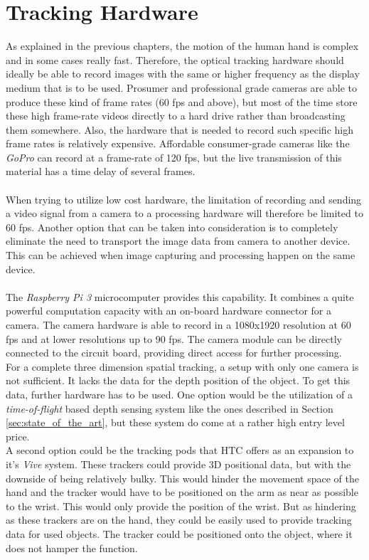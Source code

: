 \section{Tracking Hardware}
 As explained in the previous chapters, the motion of the human hand is complex and in some cases really fast. Therefore, the optical tracking hardware should ideally be able to record images with the same or higher frequency as the display medium that is to be used. Prosumer and professional grade cameras are able to produce these kind of frame rates (60 fps and above), but most of the time store these high frame-rate videos directly to a hard drive rather than broadcasting them somewhere. Also, the hardware that is needed to record such specific high frame rates is relatively expensive. Affordable consumer-grade cameras like the \textit{GoPro} can record at a frame-rate of 120 fps, but the live transmission of this material has a time delay of several frames.\\
\\When trying to utilize low cost hardware, the limitation of recording and sending a video signal from a camera to a processing hardware will therefore be limited to 60 fps.%
\newpage Another option that can be taken into consideration is to completely eliminate the need to transport the image data from camera to another device. This can be achieved when  image capturing and processing happen on the same device.\\\\The \textit{Raspberry Pi 3} microcomputer provides this capability. It combines a quite powerful computation capacity with an on-board hardware connector for a camera. The camera hardware is able to record in a 1080x1920 resolution at 60 fps and at lower resolutions up to 90 fps. The camera module can be directly connected to the circuit board, providing direct access for further processing.\\
For a complete three dimension spatial tracking, a setup with only one camera is not sufficient. It lacks the data for the depth position of the object. To get this data, further hardware has to be used. One option would be the utilization of a \textit{time-of-flight} based depth sensing system like the ones described in Section \ref{sec:state_of_the_art}, but these system do come at a rather high entry level price.
\\A second option could be the tracking pods that HTC offers as an expansion to it's \textit{Vive} system. These trackers could provide 3D positional data, but with the downside of being relatively bulky. This would hinder the movement space of the hand and the tracker would have to be positioned on the arm as near as possible to the wrist. This would  only provide the position of the wrist. But as hindering as these trackers are on the hand, they could be easily used to provide tracking data for used objects. The tracker could be positioned onto the object, where it does not hamper the function. \\\\
